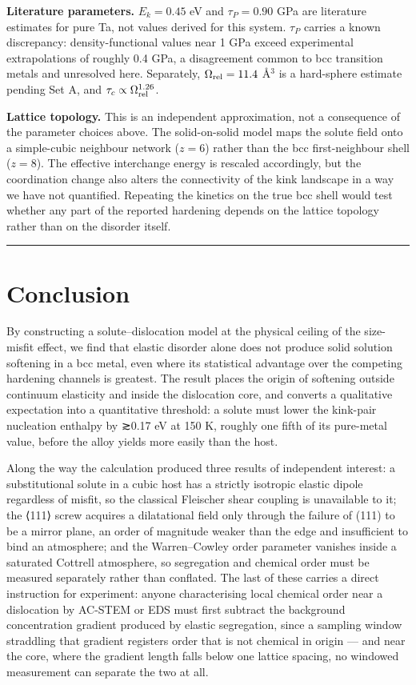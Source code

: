 \documentclass[11pt,a4paper]{article}
\begin{document}
\textbf{Literature parameters.} \(E_k = 0.45\) eV and \(\tau_P = 0.90\) GPa are literature estimates for pure Ta, not values derived for this system. \(\tau_P\) carries a known discrepancy: density-functional values near 1 GPa exceed experimental extrapolations of roughly 0.4 GPa, a disagreement common to bcc transition metals and unresolved here. Separately, \(\Omega_{\rm rel} = 11.4\) \AA\(^3\) is a hard-sphere estimate pending Set A, and \(\tau_c \propto \Omega_{\rm rel}^{1.26}\).

\textbf{Lattice topology.} This is an independent approximation, not a consequence of the parameter choices above. The solid-on-solid model maps the solute field onto a simple-cubic neighbour network (\(z=6\)) rather than the bcc first-neighbour shell (\(z=8\)). The effective interchange energy is rescaled accordingly, but the coordination change also alters the connectivity of the kink landscape in a way we have not quantified. Repeating the kinetics on the true bcc shell would test whether any part of the reported hardening depends on the lattice topology rather than on the disorder itself.

\begin{center}\rule{0.5\linewidth}{0.5pt}\end{center}

\hypertarget{conclusion}{%
\section{Conclusion}\label{sec:conclusion}}

By constructing a solute--dislocation model at the physical ceiling of the size-misfit effect, we find that elastic disorder alone does not produce solid solution softening in a bcc metal, even where its statistical advantage over the competing hardening channels is greatest. The result places the origin of softening outside continuum elasticity and inside the dislocation core, and converts a qualitative expectation into a quantitative threshold: a solute must lower the kink-pair nucleation enthalpy by ≳0.17 eV at 150 K, roughly one fifth of its pure-metal value, before the alloy yields more easily than the host.

Along the way the calculation produced three results of independent interest: a substitutional solute in a cubic host has a strictly isotropic elastic dipole regardless of misfit, so the classical Fleischer shear coupling is unavailable to it; the ⟨111⟩ screw acquires a dilatational field only through the failure of (111) to be a mirror plane, an order of magnitude weaker than the edge and insufficient to bind an atmosphere; and the Warren--Cowley order parameter vanishes inside a saturated Cottrell atmosphere, so segregation and chemical order must be measured separately rather than conflated. The last of these carries a direct instruction for experiment: anyone characterising local chemical order near a dislocation by AC-STEM or EDS must first subtract the background concentration gradient produced by elastic segregation, since a sampling window straddling that gradient registers order that is not chemical in origin --- and near the core, where the gradient length falls below one lattice spacing, no windowed measurement can separate the two at all.
\end{document}
